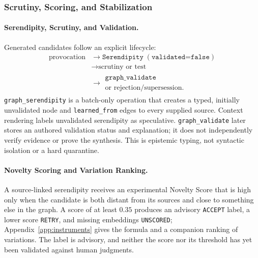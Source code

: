 \subsubsection{Scrutiny, Scoring, and Stabilization}

\paragraph{Serendipity, Scrutiny, and Validation.}
Generated candidates follow an explicit lifecycle:
\[
\begin{aligned}
\text{provocation}
&\longrightarrow \texttt{Serendipity}\;(\texttt{validated=false})\\
&\longrightarrow \text{scrutiny or test}\\
&\longrightarrow
\substack{\texttt{graph\_validate}\\\text{or rejection/supersession}.}
\end{aligned}
\]
\texttt{graph\_serendipity} is a batch-only operation that creates a typed, initially unvalidated node and \texttt{learned\_from} edges to every supplied source. Context rendering labels unvalidated serendipity as speculative. \texttt{graph\_validate} later stores an authored validation status and explanation; it does not independently verify evidence or prove the synthesis. This is epistemic typing, not syntactic isolation or a hard quarantine.

\paragraph{Novelty Scoring and Variation Ranking.}
A source-linked serendipity receives an experimental Novelty Score that is high only when the candidate is both distant from its sources and close to something else in the graph. A score of at least $0.35$ produces an advisory \texttt{ACCEPT} label, a lower score \texttt{RETRY}, and missing embeddings \texttt{UNSCORED}; Appendix~\ref{app:instruments} gives the formula and a companion ranking of variations. The label is advisory, and neither the score nor its threshold has yet been validated against human judgments.

